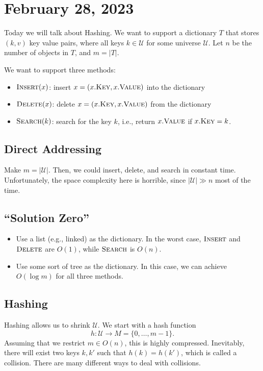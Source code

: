 \section{February 28, 2023}

Today we will talk about Hashing. We want to support a dictionary $T$ that stores $(k,v)$ key value pairs, where all keys $k\in \mathcal{U}$ for some universe $\mathcal{U}$. Let $n$ be the number of objects in $T$, and $m = \vert T\vert$.

We want to support three methods:
\begin{itemize}
    \item $\textsc{Insert}(x)$: insert $x=(x.\textsc{Key}, x.\textsc{Value})$ into the dictionary
    \item $\textsc{Delete}(x)$: delete $x=(x.\textsc{Key}, x.\textsc{Value})$ from the dictionary
    \item $\textsc{Search}(k)$: search for the key $k$, i.e., return $x.\textsc{Value}$ if $x.\textsc{Key}=k$.
\end{itemize}

\subsection{Direct Addressing}

Make $m = \vert \mathcal{U}\vert$. Then, we could insert, delete, and search in constant time. Unfortunately, the space complexity here is horrible, since $\vert \mathcal{U}\vert \gg n$ most of the time.  

\subsection{``Solution Zero''}

\begin{itemize}
    \item Use a list (e.g., linked) as the dictionary. In the worst case, $\textsc{Insert}$ and $\textsc{Delete}$ are $O(1)$, while $\textsc{Search}$ is $O(n)$.
    \item Use some sort of tree as the dictionary. In this case, we can achieve $O(\log m)$ for all three methods. 
\end{itemize}

\subsection{Hashing}

Hashing allows us to shrink $\mathcal{U}$. We start with a hash function 
\[h : \mathcal{U}\rightarrow M=\{0,\hdots, m-1\}.\]
Assuming that we restrict $m\in O(n)$, this is highly compressed. Inevitably, there will exist two keys $k,k'$ such that $h(k)=h(k')$, which is called a \ac{collision}. There are many different ways to deal with collisions. 

